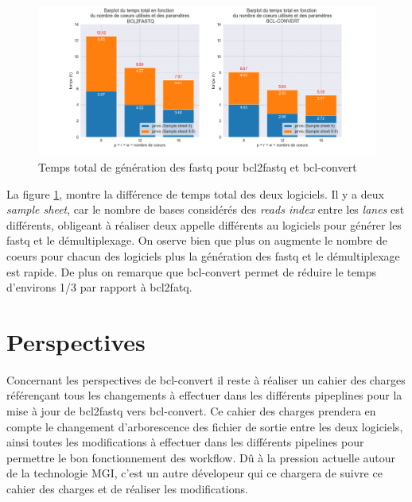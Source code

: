 \begin{figure}[H]
    \centering
    \includegraphics[width=1\textwidth]{img/barplot_total_time_comp.png}
    \caption{Temps total de génération des fastq pour bcl2fastq et bcl-convert}
    \label{fig-total-time}
\end{figure} 

La figure \ref{fig-total-time}, montre la différence de temps total des deux logiciels. Il y a deux \emph{sample sheet}, car le nombre de bases considérés des \emph{reads index} entre les \emph{lanes} est différents, obligeant à réaliser deux appelle différents au logiciels pour générer les fastq et le démultiplexage. 
On oserve bien que plus on augmente le nombre de coeurs pour chacun des logiciels plus la génération des fastq et le démultiplexage est rapide. De plus on remarque que bcl-convert permet de réduire le temps d'environs 1/3 par rapport à bcl2fatq.\\

 
\section{Perspectives}
Concernant les perspectives de bcl-convert il reste à réaliser un cahier des charges référençant tous les changements à effectuer dans les différents pipeplines pour la mise à jour de bcl2fastq vers bcl-convert. Ce cahier des charges prendera en compte le changement d'arborescence des fichier de sortie entre les deux logiciels, ainsi toutes les modifications à effectuer dans les différents pipelines pour permettre le bon fonctionnement des workflow. Dû à la pression actuelle autour de la technologie MGI, c'est un autre dévelopeur qui ce chargera de suivre ce cahier des charges et de réaliser les modifications.\\

